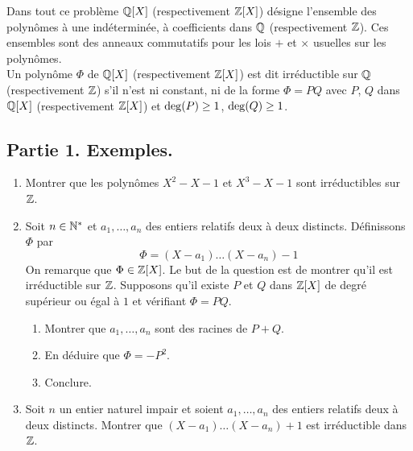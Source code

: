 Dans tout ce problème $\mathbb{Q}[X]$ (respectivement $\mathbb{Z}[X]$) désigne l'ensemble des polynômes à une indéterminée, à coefficients dans $\mathbb{Q}$ (respectivement $\mathbb{Z}$). Ces ensembles sont des anneaux commutatifs pour les lois $+$ et $\times$ usuelles sur les polynômes.\\
Un polynôme $\Phi$ de $\mathbb{Q}[X]$ (respectivement $\mathbb{Z}[X]$) est dit irréductible sur $\mathbb{Q}$ (respectivement $\mathbb{Z}$) s'il n'est ni constant, ni de la forme $\Phi=PQ$ avec $P$, $Q$ dans $\mathbb{Q}[X]$ (respectivement $\mathbb{Z}[X]$) et $\deg(P)\geq 1$, $\deg(Q)\geq 1$. 

\subsection*{Partie 1. Exemples.}
\begin{enumerate}
\item Montrer que les polynômes $X^2-X-1$ et $X^3-X-1$ sont irréductibles sur $\mathbb{Z}$.
\item Soit $n\in\mathbb{N}^*$ et $a_1,\dots,a_n$ des entiers relatifs deux à deux distincts. Définissons $\Phi$ par
\begin{displaymath}
 \Phi=(X-a_1)\dots(X-a_n)-1
\end{displaymath}
On remarque que $\Phi \in\mathbb{Z}[X]$. Le but de la question est de montrer qu'il est irréductible sur $\mathbb{Z}$. Supposons qu'il existe $P$ et $Q$ dans $\mathbb{Z}[X]$ de degré supérieur ou égal à $1$ et vérifiant $\Phi=PQ$.
\begin{enumerate}
\item Montrer que $a_1,\dots,a_n$ sont des racines de $P+Q$.
\item En déduire que $\Phi=-P^2$.
\item Conclure. 
\end{enumerate}
\item Soit $n$ un entier naturel impair et soient $a_1,\dots,a_n$ des entiers relatifs deux à deux distincts. Montrer que $(X-a_1)\dots(X-a_n)+1$ est irréductible dans $\mathbb{Z}$.
\end{enumerate}

